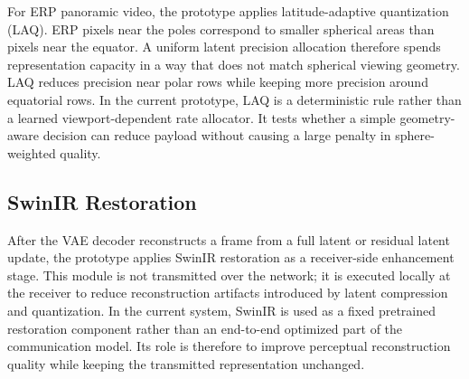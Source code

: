 \documentclass[conference]{IEEEtran}
\begin{document}
For ERP panoramic video, the prototype applies latitude-adaptive quantization (LAQ). ERP pixels near the poles correspond to smaller spherical areas than pixels near the equator. A uniform latent precision allocation therefore spends representation capacity in a way that does not match spherical viewing geometry. LAQ reduces precision near polar rows while keeping more precision around equatorial rows. In the current prototype, LAQ is a deterministic rule rather than a learned viewport-dependent rate allocator. It tests whether a simple geometry-aware decision can reduce payload without causing a large penalty in sphere-weighted quality.

\subsection{SwinIR Restoration}

After the VAE decoder reconstructs a frame from a full latent or residual latent update, the prototype applies SwinIR restoration as a receiver-side enhancement stage. This module is not transmitted over the network; it is executed locally at the receiver to reduce reconstruction artifacts introduced by latent compression and quantization. In the current system, SwinIR is used as a fixed pretrained restoration component rather than an end-to-end optimized part of the communication model. Its role is therefore to improve perceptual reconstruction quality while keeping the transmitted representation unchanged.

\end{document}
